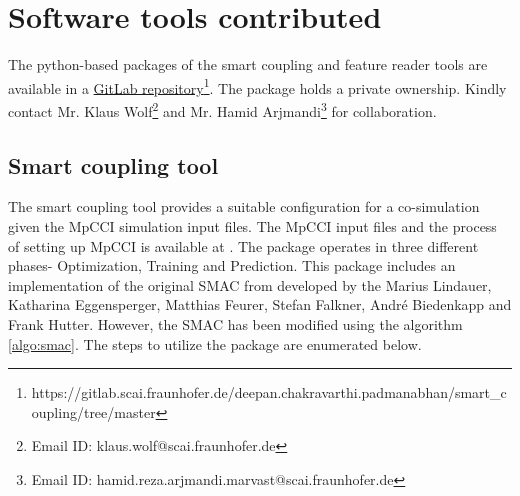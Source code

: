 \chapter{Software tools contributed}
\label{appendix:gitlab_package}

The python-based packages of the smart coupling and feature reader tools are available in a \href{https://gitlab.scai.fraunhofer.de/deepan.chakravarthi.padmanabhan/smart_coupling/tree/master}{GitLab repository}\footnote{https://gitlab.scai.fraunhofer.de/deepan.chakravarthi.padmanabhan/smart\_coupling/tree/master}. The package holds a private ownership. Kindly contact Mr. Klaus Wolf\footnote{Email ID: klaus.wolf@scai.fraunhofer.de} and Mr. Hamid Arjmandi\footnote{Email ID: hamid.reza.arjmandi.marvast@scai.fraunhofer.de} for collaboration.

\section{Smart coupling tool}
\label{appendix:smart_coupling_tool}
The smart coupling tool provides a suitable configuration for a co-simulation given the MpCCI simulation input files. The MpCCI input files and the process of setting up MpCCI is available at \cite{MpCCI_documentation}. The package operates in three different phases- Optimization, Training and Prediction. This package includes an implementation of the original SMAC from \cite{smac-github} developed by the Marius Lindauer, Katharina Eggensperger, Matthias Feurer, Stefan Falkner, André Biedenkapp and Frank Hutter. However, the SMAC has been modified using the algorithm \ref{algo:smac}. The steps to utilize the package are enumerated below. 

